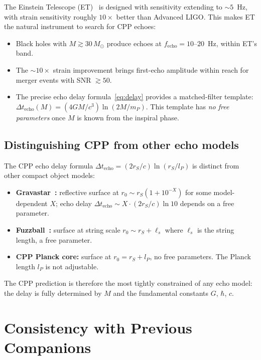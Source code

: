 \documentclass[12pt]{article}
\newcommand{\lP}{l_P}
\newcommand{\mP}{m_P}
\newcommand{\rS}{r_S}
\newcommand{\Dt}{\Delta t_{\mathrm{echo}}}
\begin{document}
The Einstein Telescope (ET)~\cite{et2010} is designed with sensitivity
extending to $\sim\!5$~Hz, with strain sensitivity roughly $10\times$
better than Advanced LIGO.  This makes ET the natural instrument to
search for CPP echoes:

\begin{itemize}[noitemsep]
  \item Black holes with $M \gtrsim 30\,M_\odot$ produce echoes at
    $f_{\mathrm{echo}} = 10$--$20$~Hz, within ET's band.
  \item The $\sim\!10\times$ strain improvement brings first-echo
    amplitude within reach for merger events with SNR $\gtrsim\!50$.
  \item The precise echo delay formula~\eqref{eq:delay} provides a
    matched-filter template: $\Dt(M) = (4GM/c^3)\ln(2M/\mP)$.
    This template has \emph{no free parameters} once $M$ is known
    from the inspiral phase.
\end{itemize}

\subsection{Distinguishing CPP from other echo models}

The CPP echo delay formula $\Dt = (2\rS/c)\ln(\rS/\lP)$ is distinct
from other compact object models:

\begin{itemize}[noitemsep]
  \item \textbf{Gravastar~\cite{mazur2001}:} reflective surface at
    $r_0 \sim \rS(1 + 10^{-X})$ for some model-dependent $X$; echo
    delay $\Dt \sim X\cdot(2\rS/c)\ln 10$ depends on a free parameter.
  \item \textbf{Fuzzball~\cite{skenderis2007}:} surface at string scale
    $r_0 \sim \rS + \ell_s$ where $\ell_s$ is the string length, a free
    parameter.
  \item \textbf{CPP Planck core:} surface at $r_0 = \rS + \lP$, no free
    parameters.  The Planck length $\lP$ is not adjustable.
\end{itemize}

The CPP prediction is therefore the most tightly constrained of any echo
model: the delay is fully determined by $M$ and the fundamental constants
$G$, $\hbar$, $c$.

\section{Consistency with Previous Companions}
\label{sec:consistency}
\end{document}
